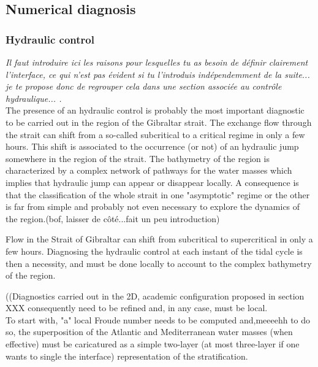 \subsection{Numerical diagnosis}
\label{PartDiag3D}

\subsubsection{Hydraulic control}
\color{green} 
\textit{Il faut introduire ici les raisons pour lesquelles tu as besoin de définir clairement l'interface, ce qui n'est pas évident si tu l'introduis indépendemment de la suite... je te propose donc de regrouper cela dans une section associée au contrôle hydraulique... .} \color{black}\\

\color{blue}The presence of an hydraulic control is probably the most important diagnostic to be carried out in the region of the Gibraltar strait. The exchange flow through the strait can shift from a so-called subcritical to a critical regime in only a few hours. This shift is associated to the occurrence (or not) of an hydraulic jump somewhere in the region of the strait. The bathymetry of the region is characterized by a complex network of pathways for the water masses which implies that hydraulic jump can appear or disappear locally. A consequence is that the classification of the whole strait in one "asymptotic" regime or the other is far from simple and probably not even necessary to explore the dynamics of the region.\color{red}(bof, laisser de côté...fait un peu introduction)

Flow in the Strait of Gibraltar can shift from subcritical to supercritical in only a few hours. Diagnosing the hydraulic control at each instant of the tidal cycle is then a necessity, and must be done locally to account to the complex bathymetry of the region. 

\color{black}

((Diagnostics carried out in the 2D, academic configuration proposed in section {XXX} consequently need to be refined and, in any case, must be local.\\

To start with, "a" local Froude number needs to be computed and,\color{red}meeeehh\color{black} to do so,  the superposition of the Atlantic and Mediterranean water masses (when effective) must be caricatured as a simple two-layer (at most three-layer if one wants to single the interface) representation of the stratification.

